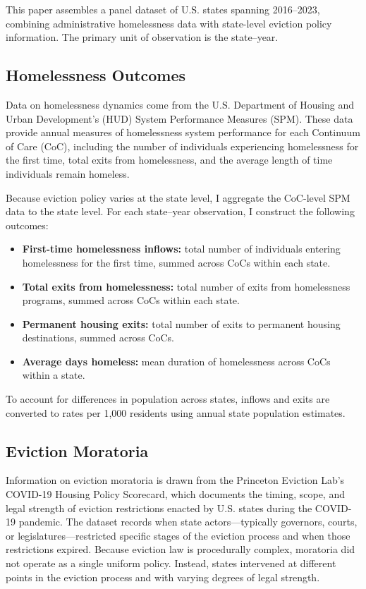\documentclass[12pt]{article}
\begin{document}
This paper assembles a panel dataset of U.S. states spanning 2016–2023, combining administrative homelessness data with state-level eviction policy information. The primary unit of observation is the state–year.

\subsection{Homelessness Outcomes}

Data on homelessness dynamics come from the U.S. Department of Housing and Urban Development’s (HUD) System Performance Measures (SPM). These data provide annual measures of homelessness system performance for each Continuum of Care (CoC), including the number of individuals experiencing homelessness for the first time, total exits from homelessness, and the average length of time individuals remain homeless.

Because eviction policy varies at the state level, I aggregate the CoC-level SPM data to the state level. For each state–year observation, I construct the following outcomes:

\begin{itemize}
\item \textbf{First-time homelessness inflows:} total number of individuals entering homelessness for the first time, summed across CoCs within each state.
\item \textbf{Total exits from homelessness:} total number of exits from homelessness programs, summed across CoCs within each state.
\item \textbf{Permanent housing exits:} total number of exits to permanent housing destinations, summed across CoCs.
\item \textbf{Average days homeless:} mean duration of homelessness across CoCs within a state.
\end{itemize}

To account for differences in population across states, inflows and exits are converted to rates per 1,000 residents using annual state population estimates.

\subsection{Eviction Moratoria}

Information on eviction moratoria is drawn from the Princeton Eviction Lab’s COVID-19 Housing Policy Scorecard, which documents the timing, scope, and legal strength of eviction restrictions enacted by U.S. states during the COVID-19 pandemic. The dataset records when state actors—typically governors, courts, or legislatures—restricted specific stages of the eviction process and when those restrictions expired. Because eviction law is procedurally complex, moratoria did not operate as a single uniform policy. Instead, states intervened at different points in the eviction process and with varying degrees of legal strength.
\end{document}
